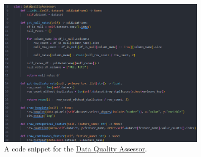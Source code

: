 \documentclass[sigconf, natbib=true]{acmart}
\begin{document}
\begin{figure}[h]
    \centering
    \includegraphics[width=0.9\textwidth]{code_data_quality_assessor.png}
    \caption{A code snippet for the \href{https://github.com/daanbrugmans/ru-data-engineering-23-24/blob/main/code/data_quality/data_quality_assessor.py}{Data Quality Assessor}.}
    \label{fig:code_data_quality_assessor}
\end{figure}
\end{document}
